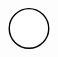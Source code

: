 \documentclass[10pt]{article}
\theoremstyle{plain}
\theoremstyle{remark}
\begin{document}
\[\begin{pgfpicture}
\begin{pgfscope}
\pgfpathcurveto{\pgfqpoint{1.453430in}{0.398474in}}{\pgfqpoint{1.432734in}{0.348509in}}{\pgfqpoint{1.432734in}{0.296419in}}%
\pgfpathcurveto{\pgfqpoint{1.432734in}{0.244328in}}{\pgfqpoint{1.453430in}{0.194363in}}{\pgfqpoint{1.490264in}{0.157530in}}%
\pgfpathcurveto{\pgfqpoint{1.527098in}{0.120696in}}{\pgfqpoint{1.577062in}{0.100000in}}{\pgfqpoint{1.629153in}{0.100000in}}%
\pgfpathclose%
\pgfusepath{stroke,fill}%
\end{pgfscope}%
\begin{pgfscope}%
\pgfsetbuttcap%
\pgfsetroundjoin%
\definecolor{currentfill}{rgb}{1.000000,1.000000,1.000000}%
\pgfsetfillcolor{currentfill}%
\pgfsetlinewidth{1.003750pt}%
\definecolor{currentstroke}{rgb}{0.000000,0.000000,0.000000}%
\pgfsetstrokecolor{currentstroke}%
\pgfsetdash{}{0pt}%
\pgfpathmoveto{\pgfqpoint{1.633603in}{5.523077in}}%
\pgfpathcurveto{\pgfqpoint{1.685694in}{5.523077in}}{\pgfqpoint{1.735658in}{5.543773in}}{\pgfqpoint{1.772492in}{5.580607in}}%
\pgfpathcurveto{\pgfqpoint{1.809325in}{5.617440in}}{\pgfqpoint{1.830021in}{5.667405in}}{\pgfqpoint{1.830021in}{5.719495in}}%
\pgfpathcurveto{\pgfqpoint{1.830021in}{5.771586in}}{\pgfqpoint{1.809325in}{5.821551in}}{\pgfqpoint{1.772492in}{5.858384in}}%
\pgfpathcurveto{\pgfqpoint{1.735658in}{5.895218in}}{\pgfqpoint{1.685694in}{5.915914in}}{\pgfqpoint{1.633603in}{5.915914in}}%
\pgfpathcurveto{\pgfqpoint{1.581512in}{5.915914in}}{\pgfqpoint{1.531548in}{5.895218in}}{\pgfqpoint{1.494714in}{5.858384in}}%
\pgfpathcurveto{\pgfqpoint{1.457880in}{5.821551in}}{\pgfqpoint{1.437184in}{5.771586in}}{\pgfqpoint{1.437184in}{5.719495in}}%
\pgfpathcurveto{\pgfqpoint{1.437184in}{5.667405in}}{\pgfqpoint{1.457880in}{5.617440in}}{\pgfqpoint{1.494714in}{5.580607in}}%
\pgfpathcurveto{\pgfqpoint{1.531548in}{5.543773in}}{\pgfqpoint{1.581512in}{5.523077in}}{\pgfqpoint{1.633603in}{5.523077in}}%
\pgfpathclose%
\pgfusepath{stroke,fill}%
\end{pgfscope}%
\begin{pgfscope}%
\pgfsetbuttcap%
\pgfsetroundjoin%
\definecolor{currentfill}{rgb}{1.000000,1.000000,1.000000}%
\pgfsetfillcolor{currentfill}%
\pgfsetlinewidth{1.003750pt}%
\definecolor{currentstroke}{rgb}{0.000000,0.000000,0.000000}%
\pgfsetstrokecolor{currentstroke}%
\pgfsetdash{}{0pt}%
\pgfpathmoveto{\pgfqpoint{2.987897in}{3.715385in}}%
\pgfpathcurveto{\pgfqpoint{3.039988in}{3.715385in}}{\pgfqpoint{3.089952in}{3.736081in}}{\pgfqpoint{3.126786in}{3.772914in}}%
\pgfpathcurveto{\pgfqpoint{3.163619in}{3.809748in}}{\pgfqpoint{3.184315in}{3.859712in}}{\pgfqpoint{3.184315in}{3.911803in}}%
\pgfpathcurveto{\pgfqpoint{3.184315in}{3.963894in}}{\pgfqpoint{3.163619in}{4.013858in}}{\pgfqpoint{3.126786in}{4.050692in}}%

\end{pgfscope}
\end{pgfpicture}\]
\end{document}
